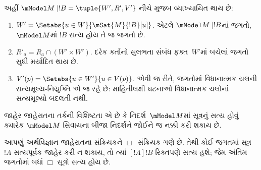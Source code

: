 \begin{defn}
\begin{enumerate}
  
  અહીં $\mModel M \mid !B = \tuple{W', R', V'}$ નીચે મુજબ
  વ્યાખ્યાયિત થાય છે:
  \begin{enumerate}
    \item $W' = \Setabs{ u \in W}{\mSat{M}{!B}[u]}$. એટલે
      $\mModel M \mid !B$નાં જગતો, $\mModel M$માં $!B$ સત્ય હોય
      તે જ જગતો છે.
    \item $R'_a = R_a \cap (W' \times W')$. દરેક કર્તાનો સુલભતા
      સંબંધ ફક્ત~$W'$માં બચેલાં જગતો સુધી મર્યાદિત થાય છે.
    \item $V'(p) = \Setabs{ u \in W'}{u \in V(p) }$. એવી જ રીતે,
      જગતોમાં વિધાનાત્મક ચલની સત્યમૂલ્ય-નિયુક્તિ એ જ રહે છે: માહિતીલક્ષી
      ઘટનાઓ વિધાનાત્મક ચલોનાં સત્યમૂલ્યો બદલતી નથી.
  \end{enumerate}
  
  \end{enumerate} 
\end{defn}


જાહેર જાહેરાતના તર્કની વિશિષ્ટતા એ છે કે નિદર્શ~$\mModel M$માં
સૂત્રનું સત્ય હોવું ક્યારેક $\mModel M$ સિવાયના બીજા
નિદર્શને જોઈને જ નક્કી કરી શકાય છે.

આપણું અર્થવિજ્ઞાન જાહેરાતના સંક્રિયકને $\Box$~સંક્રિયક ગણે છે.
તેથી કોઈ જગતમાં સૂત્ર~$!A$ સત્યપૂર્વક જાહેર કરી ન શકાય,
તો ત્યાં $[!A]!B$ રિક્તપણે સત્ય હશે; જેમ અંતિમ જગતોમાં બધાં
$\Box$ સૂત્રો સત્ય હોય છે.

